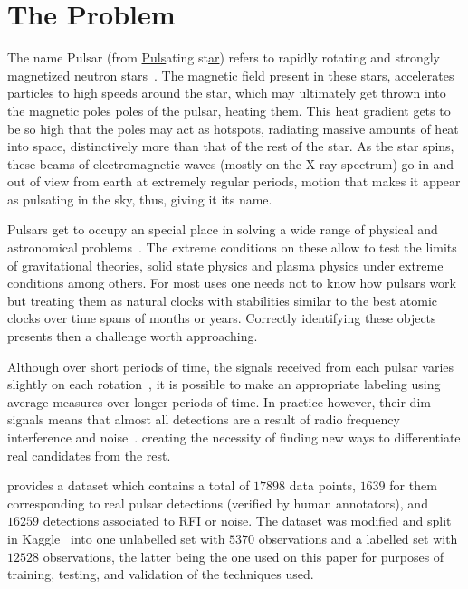 \documentclass[journal]{IEEEtran}
\begin{document}
\section{The Problem\label{sec:problem}} The name Pulsar (from
\underline{Puls}ating st\underline{ar}) refers to rapidly rotating and strongly
magnetized neutron stars~\cite{pulsar:definition:nasa}. The magnetic field
present in these stars, accelerates particles to high speeds around the star,
which may ultimately get thrown into the magnetic poles poles of the pulsar,
heating them. This heat gradient gets to be so high that the poles may act as
hotspots, radiating massive amounts of heat into space, distinctively more than
that of the rest of the star. As the star spins, these beams of electromagnetic
waves (mostly on the X-ray spectrum) go in and out of view from earth at
extremely regular periods, motion that makes it appear as pulsating in the sky,
thus, giving it its name.

Pulsars get to occupy an special place in solving a wide range of physical and
astronomical problems~\cite{pulsar:importance:kramer}. The extreme conditions on
these allow to test the limits of gravitational theories, solid state physics
and plasma physics under extreme conditions among others. For most uses one
needs not to know how pulsars work but treating them as natural clocks with
stabilities similar to the best atomic clocks over time spans of months or
years. Correctly identifying these objects presents then a challenge worth
approaching.

Although over short periods of time, the signals received from each pulsar
varies slightly on each rotation~\cite{pulsar:importance:kramer}, it is possible
to make an appropriate labeling using average measures over longer periods of
time. In practice however, their dim signals means that almost all detections
are a result of radio frequency interference and
noise~\cite{pulsar:dataset:explanation:lyon}. creating the necessity of finding
new ways to differentiate real candidates from the rest.

\citet{pulsar:dataset:lyon} provides a dataset which contains a total of $17898$
data points, $1639$ for them corresponding to real pulsar detections (verified
by human annotators), and $16259$ detections associated to RFI or noise. The
dataset was modified and split in Kaggle~\cite{pulsar:dataset:kaggle} into one
unlabelled set with $5370$ observations and a labelled set with $12528$
observations, the latter being the one used on this paper for purposes of
training, testing, and validation of the techniques used.
\end{document}
